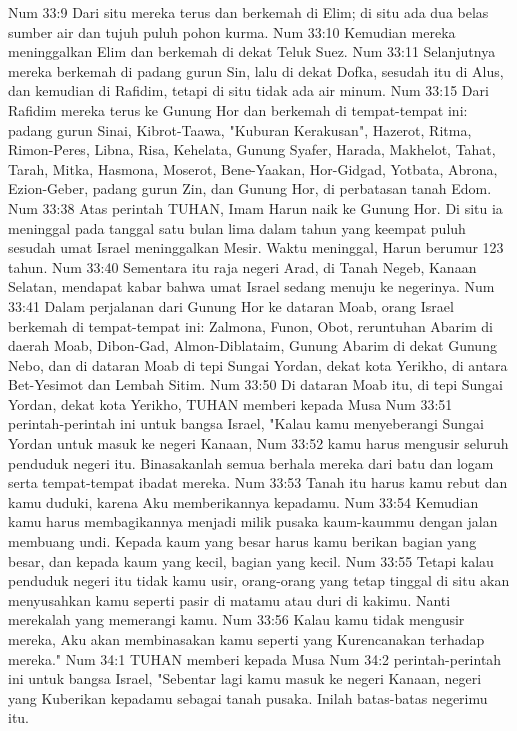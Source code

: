 Num 33:9  Dari situ mereka terus dan berkemah di Elim; di situ ada dua belas sumber air dan tujuh puluh pohon kurma.
Num 33:10  Kemudian mereka meninggalkan Elim dan berkemah di dekat Teluk Suez.
Num 33:11  Selanjutnya mereka berkemah di padang gurun Sin, lalu di dekat Dofka, sesudah itu di Alus, dan kemudian di Rafidim, tetapi di situ tidak ada air minum.
Num 33:15  Dari Rafidim mereka terus ke Gunung Hor dan berkemah di tempat-tempat ini: padang gurun Sinai, Kibrot-Taawa, "Kuburan Kerakusan", Hazerot, Ritma, Rimon-Peres, Libna, Risa, Kehelata, Gunung Syafer, Harada, Makhelot, Tahat, Tarah, Mitka, Hasmona, Moserot, Bene-Yaakan, Hor-Gidgad, Yotbata, Abrona, Ezion-Geber, padang gurun Zin, dan Gunung Hor, di perbatasan tanah Edom.
Num 33:38  Atas perintah TUHAN, Imam Harun naik ke Gunung Hor. Di situ ia meninggal pada tanggal satu bulan lima dalam tahun yang keempat puluh sesudah umat Israel meninggalkan Mesir. Waktu meninggal, Harun berumur 123 tahun.
Num 33:40  Sementara itu raja negeri Arad, di Tanah Negeb, Kanaan Selatan, mendapat kabar bahwa umat Israel sedang menuju ke negerinya.
Num 33:41  Dalam perjalanan dari Gunung Hor ke dataran Moab, orang Israel berkemah di tempat-tempat ini: Zalmona, Funon, Obot, reruntuhan Abarim di daerah Moab, Dibon-Gad, Almon-Diblataim, Gunung Abarim di dekat Gunung Nebo, dan di dataran Moab di tepi Sungai Yordan, dekat kota Yerikho, di antara Bet-Yesimot dan Lembah Sitim.
Num 33:50  Di dataran Moab itu, di tepi Sungai Yordan, dekat kota Yerikho, TUHAN memberi kepada Musa
Num 33:51  perintah-perintah ini untuk bangsa Israel, "Kalau kamu menyeberangi Sungai Yordan untuk masuk ke negeri Kanaan,
Num 33:52  kamu harus mengusir seluruh penduduk negeri itu. Binasakanlah semua berhala mereka dari batu dan logam serta tempat-tempat ibadat mereka.
Num 33:53  Tanah itu harus kamu rebut dan kamu duduki, karena Aku memberikannya kepadamu.
Num 33:54  Kemudian kamu harus membagikannya menjadi milik pusaka kaum-kaummu dengan jalan membuang undi. Kepada kaum yang besar harus kamu berikan bagian yang besar, dan kepada kaum yang kecil, bagian yang kecil.
Num 33:55  Tetapi kalau penduduk negeri itu tidak kamu usir, orang-orang yang tetap tinggal di situ akan menyusahkan kamu seperti pasir di matamu atau duri di kakimu. Nanti merekalah yang memerangi kamu.
Num 33:56  Kalau kamu tidak mengusir mereka, Aku akan membinasakan kamu seperti yang Kurencanakan terhadap mereka."
Num 34:1  TUHAN memberi kepada Musa
Num 34:2  perintah-perintah ini untuk bangsa Israel, "Sebentar lagi kamu masuk ke negeri Kanaan, negeri yang Kuberikan kepadamu sebagai tanah pusaka. Inilah batas-batas negerimu itu.
